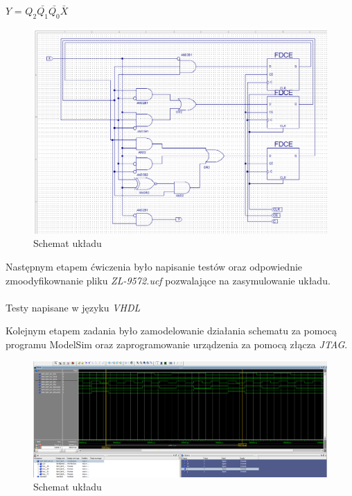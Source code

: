 \documentclass[wide,a4paper,titlepage,12pt] {article}
\begin{document}
  \begin{center}
    $Y$ = $Q_{2} \bar{Q_{1}} \bar{Q_{0}} \bar{X} $
  \end{center}


  \begin{figure}[htbp]
    \begin{center}
      \includegraphics[scale=0.4]{mealy-sch.png}
      \caption{Schemat układu}
     \end{center}
  \end{figure}

  Następnym etapem ćwiczenia było napisanie testów oraz odpowiednie zmoodyfikownanie pliku \textit{ZL-9572.ucf} pozwalające na zasymulowanie układu.



  \newpage
  \paragraph{}
  Testy napisane w języku \textit{VHDL}
  

  Kolejnym etapem zadania było zamodelowanie działania schematu za pomocą programu ModelSim oraz zaprogramowanie urządzenia za pomocą złącza \textit{JTAG}.

  \begin{figure}[htbp]
    \begin{center}
      \includegraphics[scale=0.3]{mealy-sim.png}
      \caption{Schemat układu}
     \end{center}
  \end{figure}
\end{document}
